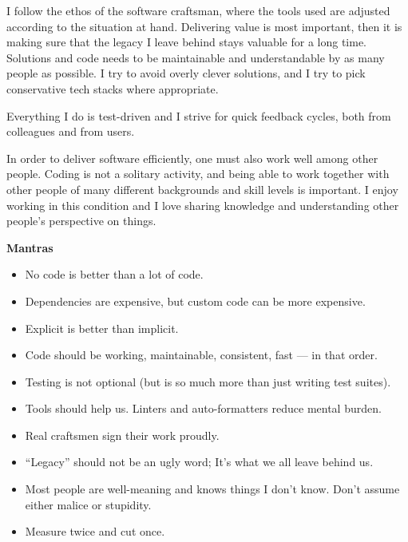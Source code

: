 \documentclass[9pt]{developercv} %
\begin{document}
\begin{minipage}[t]{0.4\textwidth} %
  \vspace{-\baselineskip}

  I follow the ethos of the software craftsman, where the tools used are
  adjusted according to the situation at hand. Delivering value is most
  important, then it is making sure that the legacy I leave behind stays
  valuable for a long time. Solutions and code needs to be maintainable and
  understandable by as many people as possible. I try to avoid overly clever
  solutions, and I try to pick conservative tech stacks where appropriate.

  Everything I do is test-driven and I strive for quick feedback cycles, both
  from colleagues and from users.

  In order to deliver software efficiently, one must also work well among other
  people. Coding is not a solitary activity, and being able to work together
  with other people of many different backgrounds and skill levels is
  important. I enjoy working in this condition and I love sharing knowledge and
  understanding other people's perspective on things.
\end{minipage}
\hfill
\begin{minipage}[t]{0.5\textwidth}
  \vspace{-\baselineskip}
  \textbf{Mantras}
  \begin{itemize}
      \item No code is better than a lot of code.
      \item Dependencies are expensive, but custom code can be more expensive.
      \item Explicit is better than implicit.
      \item Code should be working, maintainable, consistent, fast --- in that order.
      \item Testing is not optional (but is so much more than just writing test suites).
      \item Tools should help us. Linters and auto-formatters reduce mental burden.
      \item Real craftsmen sign their work proudly.
      \item ``Legacy'' should not be an ugly word; It's what we all leave behind us.
      \item Most people are well-meaning and knows things I don't know. Don't assume either malice or stupidity.
      \item Measure twice and cut once.
  \end{itemize}
\end{minipage}
\end{document}
